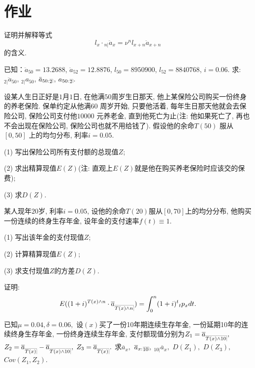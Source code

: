 \documentclass[a4paper,openany, 10pt]{ctexbook}
\makeatletter
\DeclareRobustCommand{\annu}[1]{_{%
    \def\arraystretch{0}%
    \setlength\arraycolsep{1pt}%
    \setlength\arrayrulewidth{.2pt}%
    \begin{array}[b]{@{}c|}\hline
        \\[\arraycolsep]%
        \scriptstyle #1%
    \end{array}%
}}
\makeatother
\begin{document}
\section{作业}
\begin{exs}
    证明并解释等式
    $$
        l_x \cdot {}_{n|}\ddot{a}_x = \nu^n l_{x+n} \ddot{a}_{x+n}
    $$
    的含义.
\end{exs}

\begin{exs}
    已知：$\ddot{a}_{50} = 13.2688$, $\ddot{a}_{52} = 12.8876$, $l_{50} = 8950900$, $l_{52} = 8840768$, $i = 0.06.$ 求: ${}_{2|}\ddot{a}_{50}$, ${}_{2|}a_{50}$, $\ddot{a}_{50:}{}\annu{2}$, $a_{50:}{}\annu{2}$.
\end{exs}


\begin{exs}
    设某人生日正好是$1$月$1$日, 在他满$50$周岁生日那天, 他上某保险公司购买一份终身的养老保险. 保单约定从他满$60$ 周岁开始, 只要他活着, 每年生日那天他就会去保险公司, 保险公司支付他$10000$ 元养老金, 直到他死亡为止(注: 他如果死亡了, 再也不会出现在保险公司, 保险公司也就不用给钱了). 假设他的余命$T(50)$ 服从$[0,50]$ 上的均匀分布, 利率$i=0.05.$

    (1) 写出保险公司所有支付额的总现值$Z$;

    (2) 求出精算现值$E(Z)$(注: 直观上$E(Z)$就是他在购买养老保险时应该交的保费);

    (3) 求$D(Z).$
\end{exs}

\begin{exs}
    某人现年$20$岁, 利率$i = 0.05$, 设他的余命$T(20)$服从$[0, 70]$上的均分分布, 他购买一份连续的终身生存年金, 设年金的支付速率$f(t) \equiv 1$.

    (1) 写出该年金的支付现值$Z$;

    (2) 计算精算现值$E(Z)$;

    (3) 求支付现值$Z$的方差$D(Z)$.
\end{exs}
\begin{exs}
    证明:
    $$E((1+i)^{T(x)\wedge n}\cdot \overline{a}_{\annu{T(x)\wedge n}})=\int_0^{n} (1+i)^{t}{}_tp_xdt.$$
\end{exs}
\begin{exs}
已知$\mu=0.04, \delta=0.06, $ 设$(x)$买了一份10年期连续生存年金, 一份延期10年的连续终身生存年金, 一份终身连续生存年金, 支付额现值分别为$Z_1=\overline a_{\annu {T(x) \land 10}},$ $Z_2=\overline a_{\annu {T(x) }}-\overline a_{\annu {T(x) \land 10}},$ $Z_3=\overline a_{\annu {T(x) }}.$
求$\overline a_{x},$ $\overline a_{{x:}}{}\annu{10},$ ${}_{10|}\overline{a}_{x},$ $D(Z_1),$ $D(Z_3),$ $Cov(Z_1,Z_2)$.
\end{exs}
\end{document}
